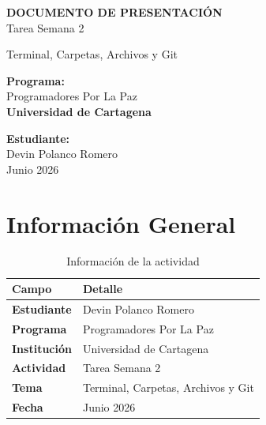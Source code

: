 \documentclass[12pt,a4paper]{article}
\begin{document}
\begin{titlepage}
    \centering
    \vspace*{2cm}
    
    {\Huge\bfseries\textcolor{azulgit}{DOCUMENTO DE PRESENTACIÓN}\\[0.5cm]}
    {\Large\textcolor{azulgit!70!black}{Tarea Semana 2}}\\[1cm]
    
    \vspace{1cm}
    
    {\Large Terminal, Carpetas, Archivos y Git}\\[2cm]
    
    \vspace{2cm}
    
    {\large\textbf{Programa:}}\\
    {\large Programadores Por La Paz}\\[1.5cm]
    
    {\large\textbf{Universidad de Cartagena}}\\[2cm]
    
    \vfill
    
    {\large\textbf{Estudiante:}}\\
    {\Large Devin Polanco Romero}\\[1cm]
    
    {\large Junio 2026}
    
\end{titlepage}

\tableofcontents
\newpage

\section{Información General}

\begin{table}[h]
\centering
\begin{tabular}{|>{\bfseries}l|l|}
\hline
\textbf{Campo} & \textbf{Detalle} \\
\hline
Estudiante & Devin Polanco Romero \\
\hline
Programa & Programadores Por La Paz \\
\hline
Institución & Universidad de Cartagena \\
\hline
Actividad & Tarea Semana 2 \\
\hline
Tema & Terminal, Carpetas, Archivos y Git \\
\hline
Fecha & Junio 2026 \\
\hline
\end{tabular}
\caption{Información de la actividad}
\end{table}
\end{document}
